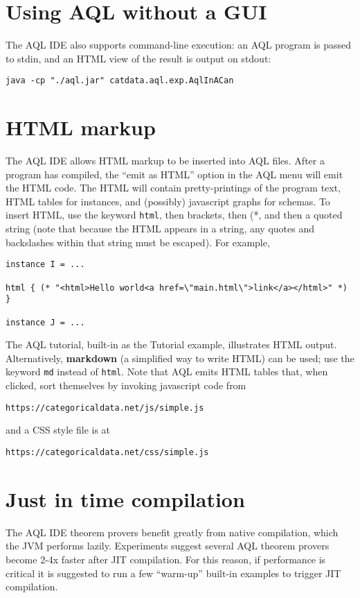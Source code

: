 \documentclass[10pt]{book}
\begin{document}
\section{Using AQL without a GUI}

The AQL IDE also supports command-line execution: an AQL program is passed to stdin, and an HTML view of the result is output on stdout:
\begin{verbatim}
java -cp "./aql.jar" catdata.aql.exp.AqlInACan
\end{verbatim}

\section{HTML markup}
The AQL IDE allows HTML markup to be inserted into AQL files.  After a program has compiled, the ``emit as HTML'' option in the AQL menu will emit the HTML code.  The HTML will contain pretty-printings of the program text, HTML tables for instances, and (possibly) javascript graphs for schemas.  To insert HTML, use the keyword {\tt html}, then brackets, then (*, and then a quoted string (note that because the HTML appears in a string, any quotes and backslashes within that string must be escaped).  For example,
\begin{verbatim}
instance I = ...

html { (* "<html>Hello world<a href=\"main.html\">link</a></html>" *) } 

instance J = ...
\end{verbatim}

The AQL tutorial, built-in as the Tutorial example, illustrates HTML output.  Alternatively, {\bf markdown} (a simplified way to write HTML) can be used; use the keyword {\tt md} instead of {\tt html}.  Note that AQL emits HTML tables that, when clicked, sort themselves by invoking javascript code from
\begin{verbatim}
https://categoricaldata.net/js/simple.js
\end{verbatim}
and a CSS style file is at
\begin{verbatim}
https://categoricaldata.net/css/simple.js
\end{verbatim}

\section{Just in time compilation}

The AQL IDE theorem provers benefit greatly from native compilation, which the JVM performs lazily.  Experiments suggest several AQL theorem provers become 2-4x faster after JIT compilation.  For this reason, if performance is critical it is suggested to run a few ``warm-up'' built-in examples to trigger JIT compilation.
\end{document}
